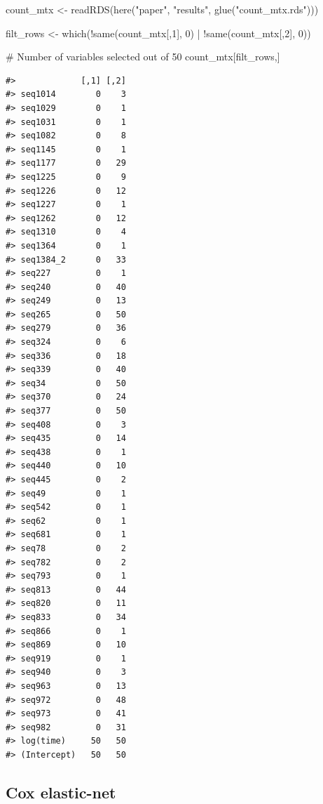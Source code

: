 \documentclass[
  12pt,
  letterpaper,
  DIV=11,
  numbers=noendperiod]{scrartcl}
\newenvironment{Shaded}{\begin{snugshade}}{\end{snugshade}}
\newcommand{\CommentTok}[1]{\textcolor[rgb]{0.37,0.37,0.37}{#1}}
\newcommand{\DecValTok}[1]{\textcolor[rgb]{0.68,0.00,0.00}{#1}}
\newcommand{\FunctionTok}[1]{\textcolor[rgb]{0.28,0.35,0.67}{#1}}
\newcommand{\NormalTok}[1]{\textcolor[rgb]{0.00,0.23,0.31}{#1}}
\newcommand{\OtherTok}[1]{\textcolor[rgb]{0.00,0.23,0.31}{#1}}
\newcommand{\SpecialCharTok}[1]{\textcolor[rgb]{0.37,0.37,0.37}{#1}}
\newcommand{\StringTok}[1]{\textcolor[rgb]{0.13,0.47,0.30}{#1}}
\begin{document}
\begin{Shaded}
\begin{Highlighting}[]
\NormalTok{count\_mtx }\OtherTok{\textless{}{-}} \FunctionTok{readRDS}\NormalTok{(}\FunctionTok{here}\NormalTok{(}\StringTok{"paper"}\NormalTok{, }\StringTok{"results"}\NormalTok{, }\FunctionTok{glue}\NormalTok{(}\StringTok{"count\_mtx.rds"}\NormalTok{)))}

\NormalTok{filt\_rows }\OtherTok{\textless{}{-}} \FunctionTok{which}\NormalTok{(}\SpecialCharTok{!}\FunctionTok{same}\NormalTok{(count\_mtx[,}\DecValTok{1}\NormalTok{], }\DecValTok{0}\NormalTok{) }\SpecialCharTok{|} 
          \SpecialCharTok{!}\FunctionTok{same}\NormalTok{(count\_mtx[,}\DecValTok{2}\NormalTok{], }\DecValTok{0}\NormalTok{)) }

\CommentTok{\# Number of variables selected out of 50}
\NormalTok{count\_mtx[filt\_rows,] }
\end{Highlighting}
\end{Shaded}

\begin{verbatim}
#>             [,1] [,2]
#> seq1014        0    3
#> seq1029        0    1
#> seq1031        0    1
#> seq1082        0    8
#> seq1145        0    1
#> seq1177        0   29
#> seq1225        0    9
#> seq1226        0   12
#> seq1227        0    1
#> seq1262        0   12
#> seq1310        0    4
#> seq1364        0    1
#> seq1384_2      0   33
#> seq227         0    1
#> seq240         0   40
#> seq249         0   13
#> seq265         0   50
#> seq279         0   36
#> seq324         0    6
#> seq336         0   18
#> seq339         0   40
#> seq34          0   50
#> seq370         0   24
#> seq377         0   50
#> seq408         0    3
#> seq435         0   14
#> seq438         0    1
#> seq440         0   10
#> seq445         0    2
#> seq49          0    1
#> seq542         0    1
#> seq62          0    1
#> seq681         0    1
#> seq78          0    2
#> seq782         0    2
#> seq793         0    1
#> seq813         0   44
#> seq820         0   11
#> seq833         0   34
#> seq866         0    1
#> seq869         0   10
#> seq919         0    1
#> seq940         0    3
#> seq963         0   13
#> seq972         0   48
#> seq973         0   41
#> seq982         0   31
#> log(time)     50   50
#> (Intercept)   50   50
\end{verbatim}

\subsection{Cox elastic-net}\label{cox-elastic-net}
\end{document}
